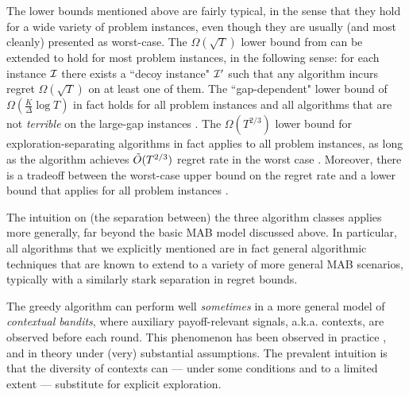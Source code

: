 The lower bounds mentioned above are fairly typical, in the sense that they hold for a wide variety of problem instances, even though they are usually (and most cleanly) presented as worst-case. The $\Omega(\sqrt{T})$ lower bound from \citet{bandits-exp3} can be extended to hold for most problem instances, in the following sense: for each instance $\mathcal{I}$ there exists a ``decoy instance" $\mathcal{I}'$ such that any algorithm incurs regret $\Omega(\sqrt{T})$ on at least one of them. The ``gap-dependent" lower bound of
 $\Omega(\tfrac{K}{\Delta}\log T)$
in fact holds for all problem instances and all algorithms that are not \emph{terrible} on the large-gap instances \citep{Lai-Robbins-85}. The $\Omega(T^{2/3})$ lower bound for exploration-separating algorithms in fact applies to all problem instances, as long as the algorithm achieves $\tilde{O}(T^{2/3})$ regret rate in the worst case \citep{MechMAB-ec09}.
Moreover, there is a tradeoff between the worst-case upper bound on the regret rate and a lower bound that applies for all problem instances \citep[Theorem 4.3 in][using the same proof technique]{MechMAB-ec09}.


The intuition on (the separation between) the three algorithm classes applies more generally, far beyond the basic MAB model discussed above. In particular, all algorithms that we explicitly mentioned are in fact general algorithmic techniques that are known to extend to a variety of more general MAB scenarios, typically with a similarly stark separation in regret bounds.


The greedy algorithm can perform well \emph{sometimes} in a more general model of \emph{contextual bandits}, where auxiliary payoff-relevant signals, a.k.a. contexts, are observed before each round. This phenomenon has been observed in practice
\citep{practicalCB-arxiv18}, and in theory \citep{kannan2018smoothed,bastani2017exploiting,externalities-colt18} under (very) substantial assumptions. The prevalent intuition is that the diversity of contexts can --- under some conditions and to a limited extent --- substitute for explicit exploration.

